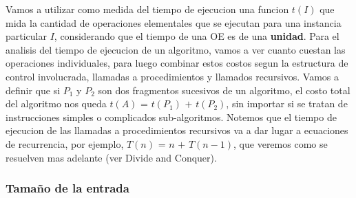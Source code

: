 \documentclass[10pt,a4paper]{article}
\begin{document}
\newline
\newline
Vamos a utilizar como medida del tiempo de ejecucion una funcion $t(I)$ que mida la cantidad de operaciones elementales que se ejecutan para una instancia particular $I$, considerando que el tiempo de una OE es de una \textbf{unidad}. Para el analisis del tiempo de ejecucion de un algoritmo, vamos a ver cuanto cuestan las operaciones individuales, para luego combinar estos costos segun la estructura de control involucrada, llamadas a procedimientos y llamados recursivos. Vamos a definir que si $P_{1}$ y $P_{2}$ son dos
fragmentos sucesivos de un algoritmo, el costo total del algoritmo nos queda $t(A)$ = $t(P_{1})$ $+$ $t(P_{2})$, sin importar si se tratan de instrucciones simples o complicados sub-algoritmos. Notemos que el tiempo de ejecucion de las llamadas a procedimientos recursivos va a dar lugar a ecuaciones de recurrencia, por ejemplo, $T(n)$ = $n$ $+$ $T(n - 1)$, que veremos como se resuelven mas adelante (ver Divide and Conquer).

\subsubsection{Tamaño de la entrada}  
\end{document}
